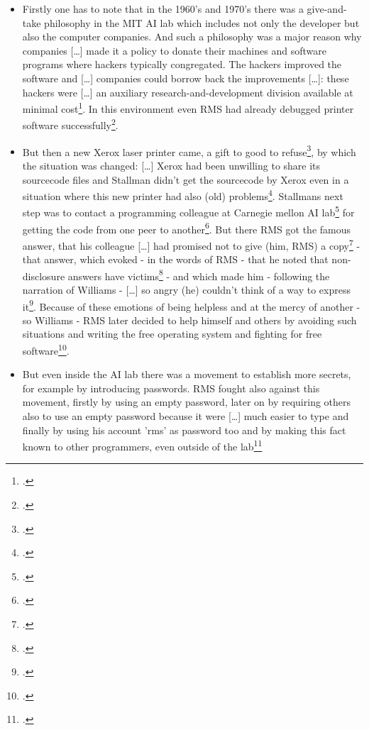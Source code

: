 \documentclass[DIV=calc,BCOR=5mm,11pt,headings=small,oneside,abstract=true, toc=bib]{scrartcl}
\begin{document}
\begin{itemize}
  \item Firstly one has to note that in the 1960's and 1970's there was a
  \glqq{}give-and-take philosophy\grqq{} in the MIT AI lab which includes not
  only the developer but also the computer companies. And \glqq{}such a
  philosophy was a major reason why companies [\ldots] made it a policy
  to donate their machines and software programs where hackers typically
  congregated\grqq{}. The hackers improved the software and \glqq{}[\ldots]
  companies could borrow back the improvements [\ldots]\grqq{}: these hackers
  were \glqq{}[\ldots] an auxiliary research-and-development division
  available at minimal cost\grqq{}\footcite[cf][4]{Williams2002a}. In this
  environment even RMS had already debugged printer software
  successfully\footcite[cf][3 and 5]{Williams2002a}.
  \item But then a new Xerox laser printer came, \glqq{}a gift to good to
  refuse\grqq{}\footcite[cf][2]{Williams2002a}, by which the situation was
  changed: \glqq{}[\ldots] Xerox had been unwilling to share its
  sourcecode files\grqq{} and Stallman didn't get the sourcecode by Xerox even
  in a situation where this new printer had also (old)
  problems\footcite[cf][6]{Williams2002a}. Stallmans next step was to contact a
  programming colleague at Carnegie mellon AI lab\footcite[cf][7]{Williams2002a}
  for getting the code from one peer to another\footcite[cf][8]{Williams2002a}.
  But there RMS got the famous answer, that his colleague \glqq{}[\ldots]
  had promised not to give (him, RMS) a
  copy\grqq{}\footcite[cf][8]{Williams2002a} - that answer, which evoked - in
  the words of RMS - that he noted that non-disclosure answers have
  victims\footcite[cf][158]{Stallman2001a} - and which made him - following the
  narration of Williams - \glqq{}[\ldots] so angry (he) couldn't think of a way
  to express it\grqq{}\footcite[cf][9]{Williams2002a}. Because of these emotions
  of being helpless and at the mercy of another - so Williams - RMS later
  decided to help himself and others by avoiding such situations and writing the
  free operating system and fighting for free
  software\footcite[cf][11f]{Williams2002a}.
  \item But even inside the AI lab there was a movement to establish more
  secrets, for example by introducing passwords. RMS fought also against this
  movement, firstly by using an empty password, later on by requiring others
  also to use an empty password because it were \glqq{}[\ldots] much easier to
  type\grqq{} and finally by using his account 'rms' as password too and by
  making this fact known to other programmers, even outside of the
  lab\footcite[cf][53ff, 93f et passim]{Williams2002a}
\end{itemize}
\end{document}
